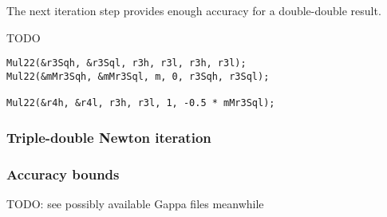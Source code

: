 The next iteration step provides enough accuracy for a double-double result.

TODO

\begin{lstlisting}[caption={Newton iteration - second double-double step},firstnumber=1]
Mul22(&r3Sqh, &r3Sql, r3h, r3l, r3h, r3l);
Mul22(&mMr3Sqh, &mMr3Sql, m, 0, r3Sqh, r3Sql);  

Mul22(&r4h, &r4l, r3h, r3l, 1, -0.5 * mMr3Sql);
\end{lstlisting}


\subsubsection{Triple-double Newton iteration}


\subsubsection{Accuracy bounds}

TODO: see possibly available Gappa files meanwhile


